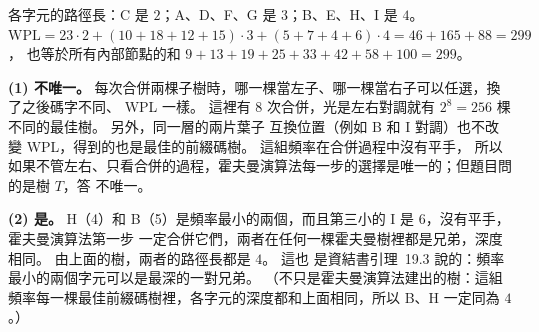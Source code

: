 \begin{pastsoln}
各字元的路徑長：C 是 $2$；A、D、F、G 是 $3$；B、E、H、I 是 $4$。
$\mathrm{WPL} = 23 \cdot 2 + (10 + 18 + 12 + 15) \cdot 3 + (5 + 7 + 4 + 6) \cdot 4 = 46 + 165 + 88 = 299$，
也等於所有內部節點的和 $9 + 13 + 19 + 25 + 33 + 42 + 58 + 100 = 299$。

\textbf{(1) 不唯一。} 每次合併兩棵子樹時，哪一棵當左子、哪一棵當右子可以任選，換了之後碼字不同、
WPL 一樣。 這裡有 $8$ 次合併，光是左右對調就有 $2^8 = 256$ 棵不同的最佳樹。 另外，同一層的兩片葉子
互換位置（例如 B 和 I 對調）也不改變 WPL，得到的也是最佳的前綴碼樹。 這組頻率在合併過程中沒有平手，
所以如果不管左右、只看合併的過程，霍夫曼演算法每一步的選擇是唯一的；但題目問的是樹 $T$，答
不唯一。

\textbf{(2) 是。} H（4）和 B（5）是頻率最小的兩個，而且第三小的 I 是 $6$，沒有平手，霍夫曼演算法第一步
一定合併它們，兩者在任何一棵霍夫曼樹裡都是兄弟，深度相同。 由上面的樹，兩者的路徑長都是 $4$。 這也
是資結書引理~19.3 說的：頻率最小的兩個字元可以是最深的一對兄弟。 （不只是霍夫曼演算法建出的樹：這組
頻率每一棵最佳前綴碼樹裡，各字元的深度都和上面相同，所以 B、H 一定同為 $4$。）
\end{pastsoln}

